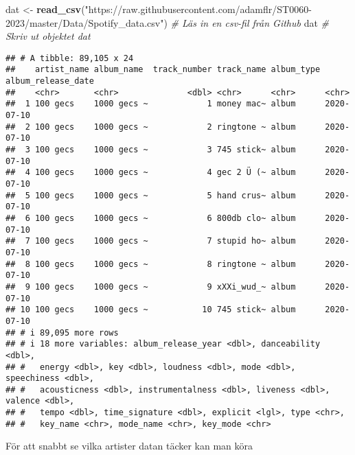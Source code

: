 \documentclass[
]{book}
\newenvironment{Shaded}{\begin{snugshade}}{\end{snugshade}}
\newcommand{\CommentTok}[1]{\textcolor[rgb]{0.56,0.35,0.01}{\textit{#1}}}
\newcommand{\FunctionTok}[1]{\textcolor[rgb]{0.13,0.29,0.53}{\textbf{#1}}}
\newcommand{\NormalTok}[1]{#1}
\newcommand{\OtherTok}[1]{\textcolor[rgb]{0.56,0.35,0.01}{#1}}
\newcommand{\SpecialCharTok}[1]{\textcolor[rgb]{0.81,0.36,0.00}{\textbf{#1}}}
\newcommand{\StringTok}[1]{\textcolor[rgb]{0.31,0.60,0.02}{#1}}
\theoremstyle{definition}
\theoremstyle{definition}
\theoremstyle{definition}
\theoremstyle{definition}
\theoremstyle{remark}
\begin{document}
\begin{Shaded}
\begin{Highlighting}[]
\NormalTok{dat }\OtherTok{\textless{}{-}} \FunctionTok{read\_csv}\NormalTok{(}\StringTok{"https://raw.githubusercontent.com/adamflr/ST0060{-}2023/master/Data/Spotify\_data.csv"}\NormalTok{) }
                                       \CommentTok{\# Läs in en csv{-}fil från Github}
\NormalTok{dat                                    }\CommentTok{\# Skriv ut objektet dat}
\end{Highlighting}
\end{Shaded}

\begin{verbatim}
## # A tibble: 89,105 x 24
##    artist_name album_name  track_number track_name album_type album_release_date
##    <chr>       <chr>              <dbl> <chr>      <chr>      <chr>             
##  1 100 gecs    1000 gecs ~            1 money mac~ album      2020-07-10        
##  2 100 gecs    1000 gecs ~            2 ringtone ~ album      2020-07-10        
##  3 100 gecs    1000 gecs ~            3 745 stick~ album      2020-07-10        
##  4 100 gecs    1000 gecs ~            4 gec 2 Ü (~ album      2020-07-10        
##  5 100 gecs    1000 gecs ~            5 hand crus~ album      2020-07-10        
##  6 100 gecs    1000 gecs ~            6 800db clo~ album      2020-07-10        
##  7 100 gecs    1000 gecs ~            7 stupid ho~ album      2020-07-10        
##  8 100 gecs    1000 gecs ~            8 ringtone ~ album      2020-07-10        
##  9 100 gecs    1000 gecs ~            9 xXXi_wud_~ album      2020-07-10        
## 10 100 gecs    1000 gecs ~           10 745 stick~ album      2020-07-10        
## # i 89,095 more rows
## # i 18 more variables: album_release_year <dbl>, danceability <dbl>,
## #   energy <dbl>, key <dbl>, loudness <dbl>, mode <dbl>, speechiness <dbl>,
## #   acousticness <dbl>, instrumentalness <dbl>, liveness <dbl>, valence <dbl>,
## #   tempo <dbl>, time_signature <dbl>, explicit <lgl>, type <chr>,
## #   key_name <chr>, mode_name <chr>, key_mode <chr>
\end{verbatim}

För att snabbt se vilka artister datan täcker kan man köra

\begin{Shaded}
\end{Shaded}
\end{document}
